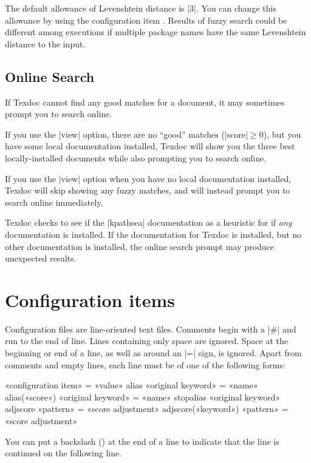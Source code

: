 \documentclass{texdoc-doc}
\begin{document}
The default allowance of Levenshtein distance is |3|. You can change this
allowance by using the configuration item . Results of fuzzy
search could be different among executions if multiple package names have the
same Levenshtein distance to the input.

\subsection{Online Search}
\label{sec:online}

If Texdoc cannot find any good matches for a document, it may sometimes prompt
you to search online.

If you use the |view| option, there are no ``good'' matches
(|score|${}\ge{}$0), but you have some local documentation installed, Texdoc will show you the three best locally-installed documents while also prompting
you to search online.

If you use the |view| option when you have no local documentation installed,
Texdoc will skip showing any fuzzy matches, and will instead prompt you to
search online immediately.

Texdoc checks to see if the |kpathsea| documentation as a heuristic for
if \emph{any} documentation is installed. If the documentation for Texdoc is
installed, but no other documentation is installed, the online search prompt
may produce unexpected results.

\section{Configuration items}
\label{sec:conf}

Configuration files are line-oriented text files. Comments begin with a |#|
and run to the end of line. Lines containing only space are ignored. Space at
the beginning or end of a line, as well as around an |=| sign, is ignored.
Apart from comments and empty lines, each line must be of one of the following
forms:
%
\begin{htcode}
«configuration item» = «value»
alias «original keyword» = «name»
alias(«score») «original keyword» = «name»
stopalias «original keyword»
adjscore «pattern» = «score adjustment»
adjscore(«keyword») «pattern» = «score adjustment»
\end{htcode}
%
You can put a backslash () at the end of a line to indicate that
the line is continued on the following line.
\end{document}
